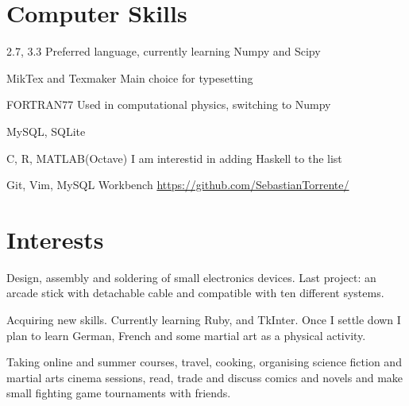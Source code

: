 \documentclass[11pt,a4paper,roman]{moderncv}
\begin{document}
\section{Computer Skills}

	{2.7, 3.3}
	{Preferred language, currently learning Numpy and Scipy}

\cvitemwithcomment{\LaTeX}
	{MikTex and Texmaker}
	{Main choice for typesetting}

	{FORTRAN77}
	{Used in computational physics, switching to Numpy}

	{MySQL, SQLite}
	{}

	{C, R, MATLAB(Octave)}
	{I am interestid in adding Haskell to the list}
	
	{Git, Vim, MySQL Workbench}
	{\href{https://github.com/SebastianTorrente/}
	{https://github.com/SebastianTorrente/}}




\section{Interests}

	{Design, assembly and soldering of small electronics devices. Last project: an arcade stick with detachable cable and compatible with ten different systems.}

	{Acquiring new skills. Currently learning Ruby, and TkInter.
	Once I settle down I plan to learn German, French and some martial art as a 
	physical activity.}


	{Taking online and summer courses, travel, cooking, organising science fiction and martial arts cinema sessions, read, trade and discuss comics and novels and make small fighting game tournaments with friends.}
\end{document}
